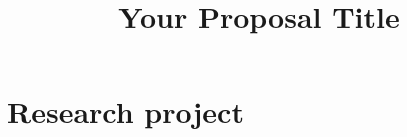 \documentclass[10pt]{article}
\title{\vspace{-3em}Your Proposal Title }
\author{}
\date{}
\begin{document}
	\maketitle
	
	
	\section{Research project}
	

	

	
	
	

	
	
	
	
	
	
	
	 
	 
	
\end{document}
